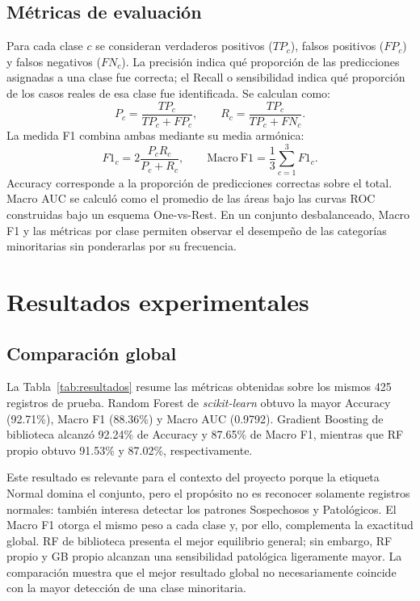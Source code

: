 \subsection{M\'etricas de evaluaci\'on}
Para cada clase $c$ se consideran verdaderos positivos ($TP_c$), falsos positivos ($FP_c$) y falsos negativos ($FN_c$). La precisi\'on indica qu\'e proporci\'on de las predicciones asignadas a una clase fue correcta; el Recall o sensibilidad indica qu\'e proporci\'on de los casos reales de esa clase fue identificada. Se calculan como:
\begin{equation}
P_c=\frac{TP_c}{TP_c+FP_c},\qquad R_c=\frac{TP_c}{TP_c+FN_c}.
\end{equation}
La medida F1 combina ambas mediante su media arm\'onica:
\begin{equation}
F1_c=2\frac{P_cR_c}{P_c+R_c},\qquad
\mathrm{Macro\ F1}=\frac{1}{3}\sum_{c=1}^{3}F1_c.
\end{equation}
Accuracy corresponde a la proporci\'on de predicciones correctas sobre el total. Macro AUC se calcul\'o como el promedio de las \'areas bajo las curvas ROC construidas bajo un esquema One-vs-Rest. En un conjunto desbalanceado, Macro F1 y las m\'etricas por clase permiten observar el desempe\~no de las categor\'ias minoritarias sin ponderarlas por su frecuencia.

\section{Resultados experimentales}
\subsection{Comparaci\'on global}
La Tabla~\ref{tab:resultados} resume las m\'etricas obtenidas sobre los mismos 425 registros de prueba. Random Forest de \textit{scikit-learn} obtuvo la mayor Accuracy (92.71\%), Macro F1 (88.36\%) y Macro AUC (0.9792). Gradient Boosting de biblioteca alcanz\'o 92.24\% de Accuracy y 87.65\% de Macro F1, mientras que RF propio obtuvo 91.53\% y 87.02\%, respectivamente.

Este resultado es relevante para el contexto del proyecto porque la etiqueta Normal domina el conjunto, pero el prop\'osito no es reconocer solamente registros normales: tambi\'en interesa detectar los patrones Sospechosos y Patol\'ogicos. El Macro F1 otorga el mismo peso a cada clase y, por ello, complementa la exactitud global. RF de biblioteca presenta el mejor equilibrio general; sin embargo, RF propio y GB propio alcanzan una sensibilidad patol\'ogica ligeramente mayor. La comparaci\'on muestra que el mejor resultado global no necesariamente coincide con la mayor detecci\'on de una clase minoritaria.

